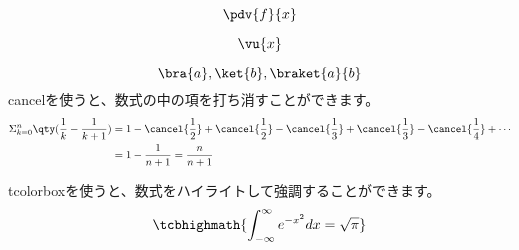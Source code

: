 \begin{equation}
    \pdv{f}{x}
\end{equation}

\begin{equation}
    \vu{x}
\end{equation}

\begin{equation}
    \bra{a}, \ket{b}, \braket{a}{b}
\end{equation}
cancelを使うと、数式の中の項を打ち消すことができます。
\begin{align*}
    \Sigma_{k = 0}^n \qty(\frac{1}{k} - \frac{1}{k + 1}) & = 1 - \cancel{\frac{1}{2}} + \cancel{\frac{1}{2}} - \cancel{\frac{1}{3}} + \cancel{\frac{1}{3}} - \cancel{\frac{1}{4}} + \cdots \\
                                                         & = 1 - \frac{1}{n + 1} = \frac{n}{n + 1}
\end{align*}

tcolorboxを使うと、数式をハイライトして強調することができます。
\begin{equation}
    \tcbhighmath{
        \int_{-\infty}^{\infty} e^{-x^2} dx = \sqrt{\pi}
    }
\end{equation}